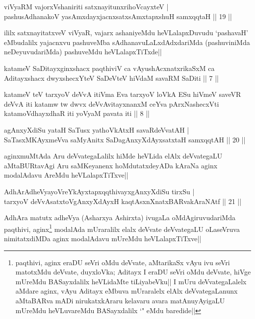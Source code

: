 
\begin{shl}
viVyaRM vajorxV\s shaniriti satxnayitunxrihoVcayxteV |\\
pashusAdhanakoV yasAmxdayxjacnxsatxsAmxtapxshuH samxqqtaH \hfill || 19 ||
\end{shl}

\begin{artha}
ililx satxnayitatxveV viVyaR, vajarx ashaniyeMdu heVLalapxDuvudu `pashavaH' eMbudalilx yajacnxvu pashuveMba sAdhanavuLaLxdAdxdariMda (pashuviniMda neDeyuvudariMda) pashuveMdu heVLalapxTiTxde||
\end{artha}

\begin{shl}
katameV SaDitayxginxshacx paqthiviV ca vAyushAcxnatxrikaSxM ca Aditayxshacx dwyxshecxYteV SaDeVteV hiVdaM savaRM SaDiti || 7 ||

katameV teV tarxyoV deVvA itiVma Eva tarxyoV loVkA ESu hiVmeV saveVR deVvA iti katamw tw dwvx deVvAvitayxnanxM ceYva pArxNashecxVti katamoV\s dhayxdhaR iti yoV\s yaM pavata iti || 8 ||
\end{shl}


\begin{shl}
agAnxyXdiSu yataH SaTusx yathoVkAtxH savaRdeVvatAH |\\
SaTasxMKAyxmeVva saMyAnitx SaDagAnxyXdAyxsatxtaH samxqqtAH \hfill || 20 ||
\end{shl}

\begin{artha}
aginxmuMtAda Aru deVvategaLalilx hiMde heVLida elAlx deVvategaLU aMtaBURtavAgi Aru saMKeyanenx hoMdutatxdeyADa kAraNa aginx modalAdavu AreMdu heVLalapxTiTxve||
\end{artha}


\begin{shl}
AdhArAdheVyayoVreYkAyxtapxqqthivayxgAnxyXdiSu tirxSu |\\
tarxyoV deVvAsatxtoV\s gAnxyXdAyxH kaqtAsxnXnatxBARvakAraNAtf \hfill || 21 ||
\end{shl}

\begin{artha}
AdhAra matutx adheVya (Asharxya Ashirxta) ivugaLa oMdAgiruvudariMda paqthivi, aginx\footnote[1]{paqthivi, aginx eraDU seVri oMdu deVvate, aMtarikaSx vAyu ivu seVri matotxMdu deVvate, duyxloVka; Aditayx I eraDU seVri oMdu deVvate, hiVge mUreMdu BASayxdalilx heVLidaMte tiLiyabeVku|| I mUru deVvategaLalelx aMdare aginx, vAyu Aditayx eMbuva mUraralelx elAlx deVvategaLanunx aMtaBARva mADi nirukatxkAraru kelavaru avara matAnuyAyigaLU mUreMdu heVLuvareMdu BASayxdalilx `\stext " eMdu baredide||} modalAda mUraralilx elalx deVvate deVvategaLU oLaseVruva nimitatxdiMDa aginx modalAdavu mUreMdu heVLalapxTiTxve||
\end{artha}

